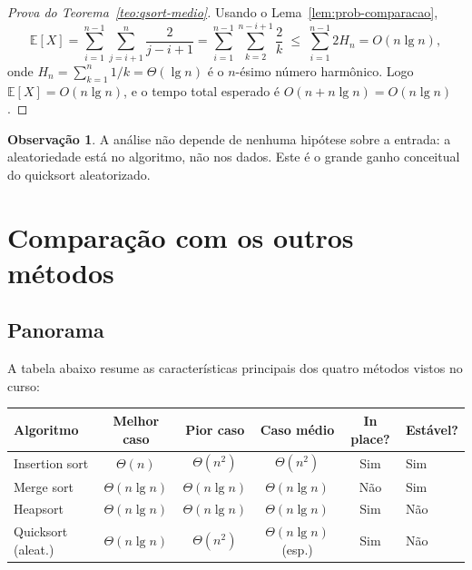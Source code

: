 \documentclass[9pt,a4paper]{extarticle}
\theoremstyle{definition}
\newtheorem{remark}{Observação}[section]
\begin{document}
\begin{proof}[Prova do Teorema~\ref{teo:qsort-medio}]
Usando o Lema~\ref{lem:prob-comparacao},
\[
  \mathbb{E}[X]
  = \sum_{i=1}^{n-1} \sum_{j=i+1}^{n} \frac{2}{j - i + 1}
  = \sum_{i=1}^{n-1} \sum_{k=2}^{n - i + 1} \frac{2}{k}
  \;\le\; \sum_{i=1}^{n-1} 2 H_n
  = O(n\lg n),
\]
onde $H_n = \sum_{k=1}^{n} 1/k = \Theta(\lg n)$ é o $n$-ésimo número
harmônico. Logo $\mathbb{E}[X] = O(n\lg n)$, e o tempo total esperado é
$O(n + n\lg n) = O(n\lg n)$.
\end{proof}

\begin{remark}
A análise não depende de nenhuma hipótese sobre a entrada: a
aleatoriedade está no algoritmo, não nos dados. Este é o grande ganho
conceitual do quicksort aleatorizado.
\end{remark}

\section{Comparação com os outros métodos}

\subsection{Panorama}

A tabela abaixo resume as características principais dos quatro métodos
vistos no curso:

\begin{center}
\small
\begin{tabularx}{\textwidth}{l c c c c X}
\toprule
\textbf{Algoritmo} & \textbf{Melhor caso} & \textbf{Pior caso} & \textbf{Caso médio} & \textbf{In place?} & \textbf{Estável?} \\
\midrule
Insertion sort    & $\Theta(n)$       & $\Theta(n^2)$   & $\Theta(n^2)$   & Sim  & Sim \\
Merge sort        & $\Theta(n\lg n)$  & $\Theta(n\lg n)$& $\Theta(n\lg n)$& Não & Sim \\
Heapsort          & $\Theta(n\lg n)$\footnotemark & $\Theta(n\lg n)$& $\Theta(n\lg n)$ & Sim & Não \\
Quicksort (aleat.)& $\Theta(n\lg n)$  & $\Theta(n^2)$   & $\Theta(n\lg n)$ (esp.) & Sim & Não \\
\bottomrule
\end{tabularx}
\end{center}
\end{document}
